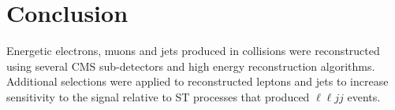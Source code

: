 \section{Conclusion}
\label{sec:recoConclusion}
Energetic electrons, muons and jets produced in collisions were reconstructed using several CMS sub-detectors and high energy 
reconstruction algorithms.  Additional selections were applied to reconstructed leptons and jets to increase sensitivity to the \WR 
signal relative to ST processes that produced $\ell\ell jj$ events.


